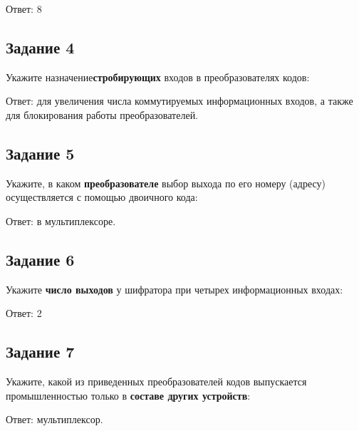 \documentclass[bachelor, och, labwork]{shiza}
\begin{document}
    Ответ: 8
    
\subsection{Задание 4}
     Укажите назначение\textbf{стробирующих} входов в преобразователях кодов: 

     Ответ: для увеличения числа коммутируемых информационных входов, а также
     для блокирования работы преобразователей.

\subsection{Задание 5}
    Укажите, в каком \textbf{преобразователе} выбор выхода по его номеру (адресу)
    осуществляется с помощью двоичного кода:

    Ответ: в мультиплексоре.
    
\subsection{Задание 6}
    Укажите \textbf{число выходов} у шифратора при четырех информационных
    входах:

    Ответ: 2
    
\subsection{Задание 7}
    Укажите, какой из приведенных преобразователей кодов выпускается промышленностью
    только в \textbf{составе других устройств}:

    Ответ: мультиплексор.
\end{document}
